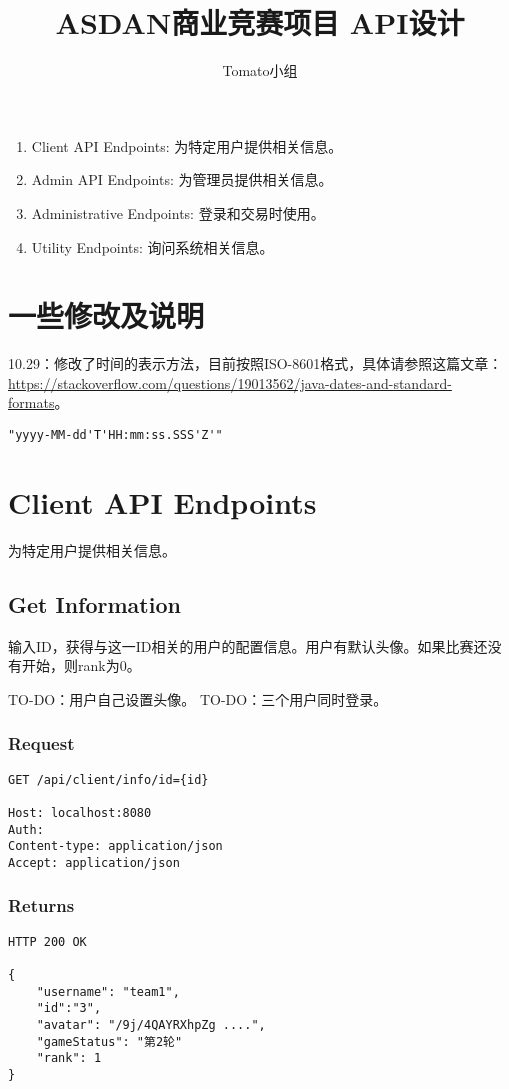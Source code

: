 \documentclass{article}
\title{ASDAN商业竞赛项目 API设计}
\author{Tomato小组}
\begin{document}
\maketitle

\tableofcontents

\newpage

\begin{enumerate}
	\item Client API Endpoints: 为特定用户提供相关信息。
	\item Admin API Endpoints: 为管理员提供相关信息。
	\item Administrative Endpoints: 登录和交易时使用。
	\item Utility Endpoints: 询问系统相关信息。
\end{enumerate}

\section{一些修改及说明}
10.29：修改了时间的表示方法，目前按照ISO-8601格式，具体请参照这篇文章：\url{https://stackoverflow.com/questions/19013562/java-dates-and-standard-formats}。

\begin{lstlisting}
"yyyy-MM-dd'T'HH:mm:ss.SSS'Z'"
\end{lstlisting}

\section{Client API Endpoints}

为特定用户提供相关信息。

\subsection{Get Information}
输入ID，获得与这一ID相关的用户的配置信息。用户有默认头像。如果比赛还没有开始，则rank为0。

TO-DO：用户自己设置头像。
TO-DO：三个用户同时登录。

\subsubsection*{Request}
\begin{lstlisting}
GET /api/client/info/id={id}

Host: localhost:8080
Auth:
Content-type: application/json
Accept: application/json
\end{lstlisting}
\subsubsection*{Returns}
\begin{lstlisting}
HTTP 200 OK

{
    "username": "team1",
    "id":"3",
    "avatar": "/9j/4QAYRXhpZg ....",
    "gameStatus": "第2轮"
    "rank": 1
}
\end{lstlisting}
\end{document}
